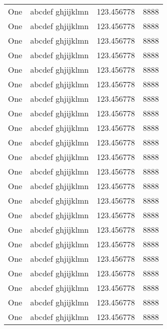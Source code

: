 \begin{center}
\begin{longtable}{| c | L{4cm} | L{6cm} | L{4cm} |}
One & abcdef ghjijklmn & 123.456778 & 8888 \\
One & abcdef ghjijklmn & 123.456778 & 8888 \\
One & abcdef ghjijklmn & 123.456778 & 8888 \\
One & abcdef ghjijklmn & 123.456778 & 8888 \\
One & abcdef ghjijklmn & 123.456778 & 8888 \\
One & abcdef ghjijklmn & 123.456778 & 8888 \\
One & abcdef ghjijklmn & 123.456778 & 8888 \\
One & abcdef ghjijklmn & 123.456778 & 8888 \\
One & abcdef ghjijklmn & 123.456778 & 8888 \\
One & abcdef ghjijklmn & 123.456778 & 8888 \\
One & abcdef ghjijklmn & 123.456778 & 8888 \\
One & abcdef ghjijklmn & 123.456778 & 8888 \\
One & abcdef ghjijklmn & 123.456778 & 8888 \\
One & abcdef ghjijklmn & 123.456778 & 8888 \\
One & abcdef ghjijklmn & 123.456778 & 8888 \\
One & abcdef ghjijklmn & 123.456778 & 8888 \\
One & abcdef ghjijklmn & 123.456778 & 8888 \\
One & abcdef ghjijklmn & 123.456778 & 8888 \\
One & abcdef ghjijklmn & 123.456778 & 8888 \\
One & abcdef ghjijklmn & 123.456778 & 8888 \\
One & abcdef ghjijklmn & 123.456778 & 8888 \\
One & abcdef ghjijklmn & 123.456778 & 8888 \\
\end{longtable}
\end{center}
\restoregeometry
